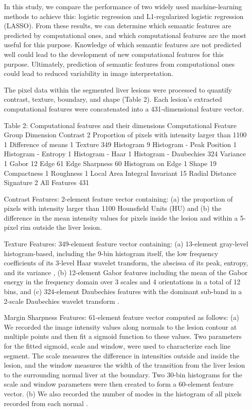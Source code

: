 In this study, we compare the performance of two widely used machine-learning methods to achieve this: logistic regression and L1-regularized logistic regression (LASSO). From these results, we can determine which semantic features are predicted by computational ones, and which computational features are the most useful for this purpose. Knowledge of which semantic features are not predicted well could lead to the development of new computational features for this purpose. Ultimately, prediction of semantic features from computational ones could lead to reduced variability in image interpretation.


The pixel data within the segmented liver lesions were processed to quantify contrast, texture, boundary, and shape (Table 2). Each lesion's extracted computational features were concatenated into a 431-dimensional feature vector.

Table 2: Computational features and their dimensions
Computational Feature Group	Dimension
Contrast	2
Proportion of pixels with intensity larger than 1100	1
Difference of means	1
Texture	349
Histogram	9
Histogram - Peak Position	1
Histogram - Entropy	1
Histogram - Haar	1
Histogram - Daubechies	324
Variance	1
Gabor	12
Edge	61
Edge Sharpness	60
Histogram on Edge	1
Shape	19
Compactness	1
Roughness	1
Local Area Integral Invariant	15
Radial Distance Signature	2
All Features	431


Contrast Features: 2-element feature vector containing: (a) the proportion of pixels with intensity larger than 1100 Hounsfield Units (HU) and (b) the difference in the mean intensity values for pixels inside the lesion and within a 5-pixel rim outside the liver lesion.

Texture Features: 349-element feature vector containing: (a) 13-element gray-level histogram-based, including the 9-bin histogram itself, the low frequency coefficients of its 3-level Haar wavelet transform, the abscissa of its peak, entropy, and its variance \cite{Strela:1999ei}, (b) 12-element Gabor features \cite{Zhao:2004gc} including the mean of the Gabor energy in the frequency domain over 3 scales and 4 orientations in a total of 12 bins, and (c) 324-element Daubechies features with the dominant sub-band in a 2-scale Daubechies wavelet transform \cite{Wang:1998jv}.

Margin Sharpness Features: 61-element feature vector computed as follows: (a) We recorded the image intensity values along normals to the lesion contour at multiple points and then fit a sigmoid function to these values.  Two parameters for the fitted sigmoid, scale and window, were used to characterize each line segment. The scale measures the difference in intensities outside and inside the lesion, and the window measures the width of the transition from the liver lesion to the surrounding normal liver at the boundary. Two 30-bin histograms for the scale and window parameters were then created to form a 60-element feature vector. (b) We also recorded the number of modes in the histogram of all pixels recorded from each normal \cite{Xu:2012bh}.

